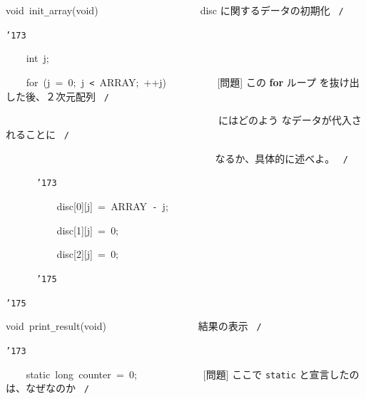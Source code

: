 \documentclass{article}
\begin{document}
\noindent
\mbox{}\hfill

\noindent
\mbox{}void{\tt\mc \ }init{\tt\_}array(void){\tt\mc \ \ \ }{\tt\mc \ \ \ \ \ \ \ \ }{\tt\mc \ \ \ \ \ \ \ \ }\rm\mc {\tt /}{\tt *}\  {}disc に関するデータの初期化
					   \hfill \rm\mc \ {\tt *}{\tt /}
\tt\mc 

\noindent
\mbox{}{\tt\char'173}

\noindent
\mbox{}{\tt\mc \ \ \ \ }int{\tt\mc \ }j;

\noindent
\mbox{}\hfill

\noindent
\mbox{}{\tt\mc \ \ \ \ }for{\tt\mc \ }(j{\tt\mc \ }={\tt\mc \ }0;{\tt\mc \ }j{\tt\mc \ }{\tt <}{\tt\mc \ }ARRAY;{\tt\mc \ }++j){\tt\mc \ }{\tt\mc \ \ \ \ \ \ \ \ }\rm\mc {\tt /}{\tt *}\  {}[問題] この {\bf for} ループ
					   を抜け出した後、２次元配列
					   \hfill \rm\mc \ {\tt *}{\tt /}
\tt\mc 

\noindent
\mbox{}{\tt\mc \ \ \ \ \ \ \ \ }{\tt\mc \ \ \ \ \ \ \ \ }{\tt\mc \ \ \ \ \ \ \ \ }{\tt\mc \ \ \ \ \ \ \ \ }{\tt\mc \ \ \ \ \ \ \ \ }\rm\mc {\tt /}{\tt *}\   にはどのよう
					   なデータが代入されることに
					   \hfill \rm\mc \ {\tt *}{\tt /}
\tt\mc 

\noindent
\mbox{}{\tt\mc \ \ \ \ \ \ \ \ }{\tt\mc \ \ \ \ \ \ \ \ }{\tt\mc \ \ \ \ \ \ \ \ }{\tt\mc \ \ \ \ \ \ \ \ }{\tt\mc \ \ \ \ \ \ \ \ }\rm\mc {\tt /}{\tt *}\  {}なるか、具体的に述べよ。
					   \hfill \rm\mc \ {\tt *}{\tt /}
\tt\mc 

\noindent
\mbox{}{\tt\mc \ \ \ \ \ \ }{\tt\char'173}

\noindent
\mbox{}{\tt\mc \ \ \ \ \ \ \ \ }{\tt\mc \ \ }disc[0][j]{\tt\mc \ }={\tt\mc \ }ARRAY{\tt\mc \ }{\tt -}{\tt\mc \ }j;

\noindent
\mbox{}{\tt\mc \ \ \ \ \ \ \ \ }{\tt\mc \ \ }disc[1][j]{\tt\mc \ }={\tt\mc \ }0;

\noindent
\mbox{}{\tt\mc \ \ \ \ \ \ \ \ }{\tt\mc \ \ }disc[2][j]{\tt\mc \ }={\tt\mc \ }0;

\noindent
\mbox{}{\tt\mc \ \ \ \ \ \ }{\tt\char'175}

\noindent
\mbox{}{\tt\char'175}

\noindent
\mbox{}\hfill

\noindent
\mbox{}void{\tt\mc \ }print{\tt\_}result(void){\tt\mc \ }{\tt\mc \ \ \ \ \ \ \ \ }{\tt\mc \ \ \ \ \ \ \ \ }\rm\mc {\tt /}{\tt *}\  {}結果の表示 \hfill \rm\mc \ {\tt *}{\tt /}
\tt\mc 

\noindent
\mbox{}{\tt\char'173}

\noindent
\mbox{}{\tt\mc \ \ \ \ }static{\tt\mc \ }long{\tt\mc \ }counter{\tt\mc \ }={\tt\mc \ }0;{\tt\mc \ \ \ \ }{\tt\mc \ \ \ \ \ \ \ \ }\rm\mc {\tt /}{\tt *}\  {}[問題] ここで {\tt static}
					   と宣言したのは、なぜなのか
					   \hfill \rm\mc \ {\tt *}{\tt /}
\tt\mc 
\end{document}
